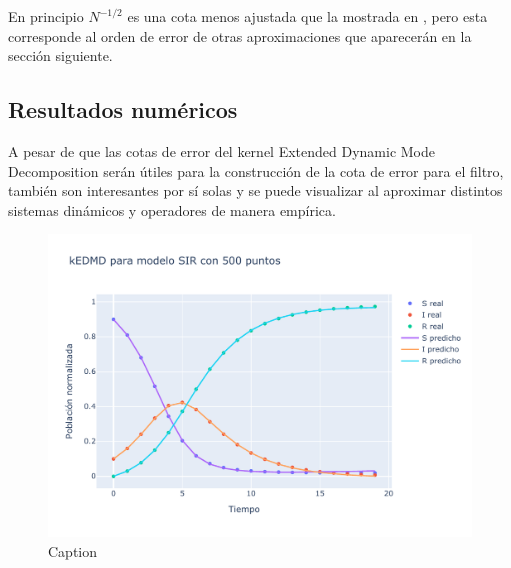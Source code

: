 	En principio $N^{-1/2}$ es una cota menos ajustada que la mostrada en \cite{Philipp2024ErrorOperator}, pero esta corresponde al orden de error de otras aproximaciones que aparecerán en la sección siguiente.


\subsection{Resultados numéricos}

A pesar de que las cotas de error del kernel Extended Dynamic Mode Decomposition serán útiles para la construcción de la cota de error para el filtro, también son interesantes por sí solas y se puede visualizar al aproximar distintos sistemas dinámicos y operadores de manera empírica.

\begin{figure}[h!]
    \centering
    \includegraphics[width=0.5\linewidth]{img/content/chapter3/Lineal.pdf}
    \caption{Caption}
    \label{fig:enter-label}
\end{figure}
